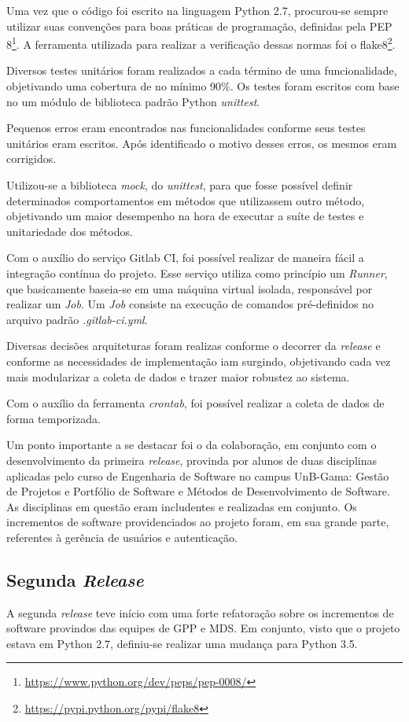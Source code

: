 Uma vez que o código foi escrito na linguagem Python 2.7, procurou-se sempre utilizar suas convenções para boas práticas de programação, definidas pela PEP 8\footnote{\url{https://www.python.org/dev/peps/pep-0008/}}. A ferramenta utilizada para realizar a verificação dessas normas foi o flake8\footnote{\url{https://pypi.python.org/pypi/flake8}}.

Diversos testes unitários foram realizados a cada término de uma funcionalidade, objetivando uma cobertura de no mínimo 90\%. Os testes foram escritos com base no um módulo de biblioteca padrão Python \textit{unittest}.

Pequenos erros eram encontrados nas funcionalidades conforme seus testes unitários eram escritos. Após identificado o motivo desses erros, os mesmos eram corrigidos.

Utilizou-se a biblioteca \textit{mock}, do \textit{unittest}, para que fosse possível definir determinados comportamentos em métodos que utilizassem outro método, objetivando um maior desempenho na hora de executar a suíte de testes e unitariedade dos métodos.

Com o auxílio do serviço Gitlab CI, foi possível realizar de maneira fácil a integração contínua do projeto. Esse serviço utiliza como princípio um \textit{Runner}, que basicamente baseia-se em uma máquina virtual isolada, responsável por realizar um \textit{Job}. Um \textit{Job} consiste na execução de comandos pré-definidos no arquivo padrão \textit{.gitlab-ci.yml}.

Diversas decisões arquiteturas foram realizas conforme o decorrer da \textit{release} e conforme as necessidades de implementação iam surgindo, objetivando cada vez mais modularizar a coleta de dados e trazer maior robustez ao sistema.

Com o auxílio da ferramenta \textit{crontab}, foi possível realizar a coleta de dados de forma temporizada.

Um ponto importante a se destacar foi o da colaboração, em conjunto com o desenvolvimento da primeira \textit{release}, provinda por alunos de duas disciplinas aplicadas pelo curso de Engenharia de Software no campus UnB-Gama: Gestão de Projetos e Portfólio de Software e Métodos de Desenvolvimento de Software. As disciplinas em questão eram includentes e realizadas em conjunto. Os incrementos de software providenciados ao projeto foram, em sua grande parte, referentes à gerência de usuários e autenticação.

\subsection{Segunda \textit{Release}}
A segunda \textit{release} teve início com uma forte refatoração sobre os incrementos de software provindos das equipes de GPP e MDS. Em conjunto, visto que o projeto estava em Python 2.7, definiu-se realizar uma mudança para Python 3.5.

